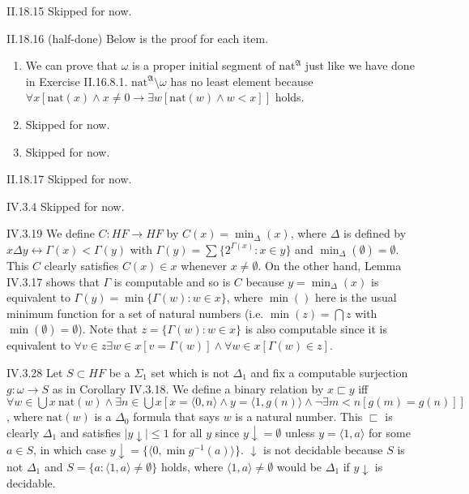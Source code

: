 \documentclass[12pt]{article}
\begin{document}
\begin{customthm}{II.18.15}
  Skipped for now.
\end{customthm}

\begin{customthm}{II.18.16} (half-done)
  Below is the proof for each item.
  \begin{enumerate}
    \item We can prove that $\omega$ is a proper initial segment of $\mathrm{nat}^\mathfrak{A}$ just like we have done in Exercise II.16.8.1. $\mathrm{nat}^\mathfrak{A}\setminus\omega$ has no least element because $\forall x[\mathrm{nat}(x)\wedge x\neq0\rightarrow\exists w[\mathrm{nat}(w)\wedge w<x]]$ holds.
    \item Skipped for now.
    \item Skipped for now.
  \end{enumerate}
\end{customthm}

\begin{customthm}{II.18.17}
  Skipped for now.
\end{customthm}

\begin{customthm}{IV.3.4}
  Skipped for now.
\end{customthm}

\begin{customthm}{IV.3.19}
  We define $C:HF\rightarrow HF$ by $C(x)=\min_\Delta(x)$, where $\Delta$ is defined by $x\Delta y\leftrightarrow\Gamma(x)<\Gamma(y)$ with $\Gamma(y)=\sum\{2^{\Gamma(x)}:x\in y\}$ and $\min_\Delta(\emptyset)=\emptyset$. This $C$ clearly satisfies $C(x)\in x$ whenever $x\neq\emptyset$. On the other hand, Lemma IV.3.17 shows that $\Gamma$ is computable and so is $C$ because $y=\min_\Delta(x)$ is equivalent to $\Gamma(y)=\min\{\Gamma(w):w\in x\}$, where $\min()$ here is the usual minimum function for a set of natural numbers (i.e. $\min(z)=\bigcap z$ with $\min(\emptyset)=\emptyset$). Note that $z=\{\Gamma(w):w\in x\}$ is also computable since it is equivalent to $\forall v\in z\exists w\in x[v=\Gamma(w)]\wedge\forall w\in x[\Gamma(w)\in z]$.
\end{customthm}

\begin{customthm}{IV.3.28}
  Let $S\subset HF$ be a $\Sigma_1$ set which is not $\Delta_1$ and fix a computable surjection $g:\omega\rightarrow S$ as in Corollary IV.3.18. We define a binary relation by $x\sqsubset y$ iff $\forall w\in\bigcup x~\mathrm{nat}(w)\wedge\exists n\in\bigcup x[x=\langle0,n\rangle\wedge y=\langle1,g(n)\rangle\wedge\neg\exists m<n[g(m)=g(n)]]$, where $\mathrm{nat}(w)$ is a $\Delta_0$ formula that says $w$ is a natural number. This $\sqsubset$ is clearly $\Delta_1$ and satisfies $|y\downarrow|\leq1$ for all $y$ since $y\downarrow=\emptyset$ unless $y=\langle1,a\rangle$ for some $a\in S$, in which case $y\downarrow=\{\langle0,\min g^{-1}(a)\rangle\}$. $\downarrow$ is not decidable because $S$ is not $\Delta_1$ and $S=\{a:\langle1,a\rangle\neq\emptyset\}$ holds, where $\langle1,a\rangle\neq\emptyset$ would be $\Delta_1$ if $y\downarrow$ is decidable.
\end{customthm}
\end{document}
